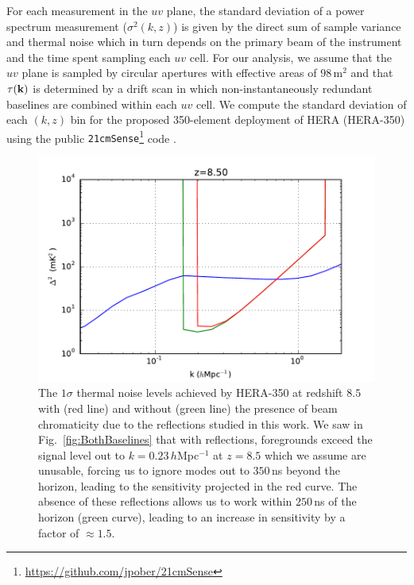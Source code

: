 \documentclass[twocolumn]{emulateapj}
\begin{document}
For each measurement in the $uv$ plane, the standard deviation of a power spectrum measurement ($\sigma^2(k,z)$) is given by the direct sum of sample variance and thermal noise \citep{McQuinn:2006} which in turn depends on the primary beam of the instrument and the time spent sampling each $uv$ cell. For our analysis, we assume that the $uv$ plane is sampled by circular apertures with effective areas of $98$\,m$^2$ and that $\tau({\bf k})$ is determined by a drift scan in which non-instantaneously redundant baselines are combined within each $uv$ cell. We compute the standard deviation of each $(k,z)$ bin for the proposed 350-element deployment of HERA (HERA-350) using the public {\tt 21cmSense}\footnote{\url{https://github.com/jpober/21cmSense}} code \citep{Pober:2013b,Pober:2014}. 





\begin{figure}
\includegraphics[width=.5\textwidth]{figures/sensitivity_comparison_v2.pdf}
\caption{The $1\sigma$ thermal noise levels achieved by HERA-350 at redshift $8.5$ with (red line) and without (green line) the presence of beam chromaticity due to the reflections studied in this work. We saw in Fig.~\ref{fig:BothBaselines} that with reflections, foregrounds exceed the signal level out to $k=0.23$\,$h$Mpc$^{-1}$ at $z=8.5$ which we assume are unusable, forcing us to ignore modes out to $350$\,ns beyond the horizon, leading to the sensitivity projected in the red curve. The absence of these reflections allows us to work within $250$\,ns of the horizon (green curve), leading to an increase in sensitivity by a factor of $\approx 1.5$. }
\label{fig:Sensitivity}
\end{figure}
\end{document}
